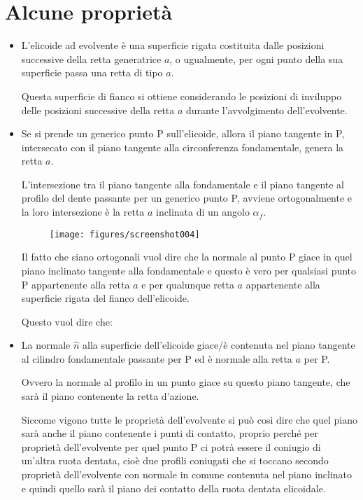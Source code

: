 \documentclass[a4paper, 15pt]{article}
\begin{document}
\section{Alcune proprietà}
\begin{adjustwidth}{2in}{}	
	\begin{itemize}
		\item L’elicoide ad evolvente è una superficie rigata costituita dalle posizioni successive della retta generatrice $a$, o ugualmente, per ogni punto della sua superficie passa una retta di tipo $a$. \newline 
		
		Questa superficie di fianco si ottiene considerando le posizioni di inviluppo delle posizioni successive  della retta $a$ durante l'avvolgimento dell'evolvente. 
		
		\item Se si prende un generico punto P sull'elicoide, allora il piano tangente in P, intersecato con  il piano tangente alla circonferenza fondamentale, genera la retta $a$. \newline 
		
		L'intersezione tra il piano tangente alla fondamentale e il piano tangente al profilo del dente passante per un generico punto P, avviene ortogonalmente e la loro intersezione è la retta $a$ inclinata di un angolo $\alpha_f$. 
		\begin{figure}[H]
			\centering
			\texttt{[image: figures/screenshot004]}
			\label{fig:screenshot004.1}
		\end{figure}
		Il fatto che siano ortogonali vuol dire che la normale al punto P giace in quel piano inclinato tangente alla fondamentale e questo è vero per qualsiasi punto P appartenente alla retta $a$ e per qualunque retta $a$ appartenente alla superficie rigata del fianco  dell'elicoide. 
		
		Questo vuol dire che:   
		
		\item La normale $\hat{n}$ alla superficie dell'elicoide giace/è contenuta nel piano tangente al cilindro fondamentale passante per P ed è normale alla retta $a$ per P. 
		
		Ovvero la normale al profilo in un punto giace su questo piano tangente, che sarà il piano contenente la retta d'azione. \newline 
		
		Siccome vigono tutte le proprietà dell'evolvente si può così dire che quel piano sarà anche il piano contenente i punti di contatto, proprio perché per proprietà dell'evolvente per quel punto P ci potrà essere il coniugio di un'altra ruota dentata, cioè due profili coniugati che si toccano secondo proprietà dell'evolvente con normale in comune contenuta nel piano inclinato e quindi quello sarà il piano dei contatto della ruota dentata elicoidale. \newline 
		

\end{itemize}
\end{adjustwidth}
\end{document}
